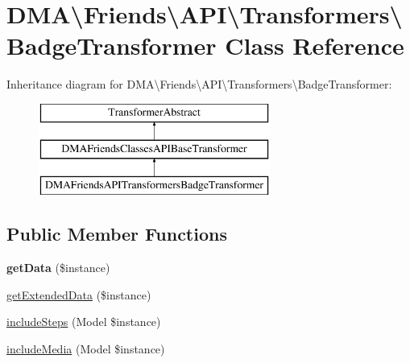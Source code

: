 \hypertarget{classDMA_1_1Friends_1_1API_1_1Transformers_1_1BadgeTransformer}{}\section{D\+M\+A\textbackslash{}Friends\textbackslash{}A\+P\+I\textbackslash{}Transformers\textbackslash{}Badge\+Transformer Class Reference}
\label{classDMA_1_1Friends_1_1API_1_1Transformers_1_1BadgeTransformer}
Inheritance diagram for D\+M\+A\textbackslash{}Friends\textbackslash{}A\+P\+I\textbackslash{}Transformers\textbackslash{}Badge\+Transformer\+:\begin{figure}[H]
\begin{center}
\leavevmode
\includegraphics[height=3.000000cm]{d7/d79/classDMA_1_1Friends_1_1API_1_1Transformers_1_1BadgeTransformer}
\end{center}
\end{figure}
\subsection*{Public Member Functions}
\begin{DoxyCompactItemize}
\item 
\hypertarget{classDMA_1_1Friends_1_1API_1_1Transformers_1_1BadgeTransformer_a08baf63a97cf8ce2e377162bcf6c00a5}{}{\bfseries get\+Data} (\$instance)\label{classDMA_1_1Friends_1_1API_1_1Transformers_1_1BadgeTransformer_a08baf63a97cf8ce2e377162bcf6c00a5}

\item 
\hyperlink{classDMA_1_1Friends_1_1API_1_1Transformers_1_1BadgeTransformer_a8687692fddb3b0c6b47bb1a2f4ac45ce}{get\+Extended\+Data} (\$instance)
\item 
\hyperlink{classDMA_1_1Friends_1_1API_1_1Transformers_1_1BadgeTransformer_af14a3d805e9bdd81d5c9e5e334ab3617}{include\+Steps} (Model \$instance)
\item 
\hyperlink{classDMA_1_1Friends_1_1API_1_1Transformers_1_1BadgeTransformer_aa3b6235d12b9c07bf3e3126b493a9885}{include\+Media} (Model \$instance)
\end{DoxyCompactItemize}
